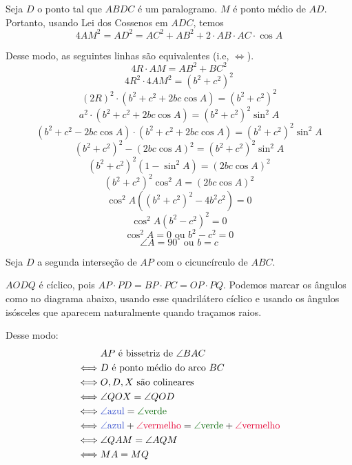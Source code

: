\documentclass[10pt, a4paper]{article}
\begin{document}
	Seja $D$ o ponto tal que $ABDC$ é um paralogramo. $M$ é ponto médio de $AD$. Portanto, usando Lei dos Cossenos em $ADC$, temos \[ 4 AM^2 = AD^2 = AC^2 + AB^2 + 2 \cdot AB \cdot AC \cdot \cos A\]

	Desse modo, as seguintes linhas são equivalentes (i.e, $\iff$).
	\[ 4R \cdot AM = AB^2 + BC^2\]
	\[ 4R^2 \cdot 4 AM^2 = (b^2 + c^2)^2\]
	\[ (2R)^2 \cdot (b^2 + c^2 + 2bc\cos A) = (b^2 + c^2)^2\]
	\[ a^2 \cdot (b^2 + c^2 + 2bc\cos A) = (b^2 + c^2)^2 \sin^2 A\]
	\[ (b^2 + c^2 - 2bc\cos A) \cdot (b^2 + c^2 + 2bc\cos A) = (b^2 + c^2)^2 \sin^2 A\]
	\[ (b^2 + c^2)^2 - (2bc\cos A)^2 = (b^2 + c^2)^2 \sin^2 A\]
	\[ (b^2 + c^2)^2  (1 - \sin^2 A) = (2bc\cos A)^2\]
	\[ (b^2 + c^2)^2  \cos^2 A = (2bc\cos A)^2\]
	\[ \cos^2 A ( (b^2 + c^2)^2 - 4b^2c^2 ) = 0\]
	\[ \cos^2 A (b^2 - c^2)^2 = 0\]
	\[ \cos^2 A = 0  \text{ ou } b^2 - c^2 = 0\]
	\[ \angle A = 90^\circ  \text{ ou } b = c\]


	\newpage


	Seja $D$ a segunda interseção de $AP$ com o cicuncírculo de $ABC$.

	$AODQ$ é cíclico, pois $AP \cdot PD = BP \cdot PC = OP \cdot PQ$. Podemos marcar os ângulos como no diagrama abaixo, usando esse quadrilátero cíclico e usando os ângulos isósceles que aparecem naturalmente quando traçamos raios.

	Desse modo:
	\begin{align*}
		     & \text{$AP$ é bissetriz de $\angle BAC$}\\
		\iff & \text{$D$ é ponto médio do arco $BC$}\\
		\iff & \text{$O, D, X$ são colineares}\\
		\iff & \angle QOX = \angle QOD\\
		\iff & {\color{xdxdff} \angle \mathrm{azul}} = {\color{qqwuqq} \angle \mathrm{verde}}\\
		\iff & {\color{xdxdff} \angle \mathrm{azul}} + {\color{ffqqqq} \angle \mathrm{vermelho}}
			   = {\color{qqwuqq} \angle \mathrm{verde}} + {\color{ffqqqq} \angle \mathrm{vermelho}}\\
		\iff & \angle QAM = \angle AQM\\
		\iff & MA = MQ
	\end{align*}
\end{document}

